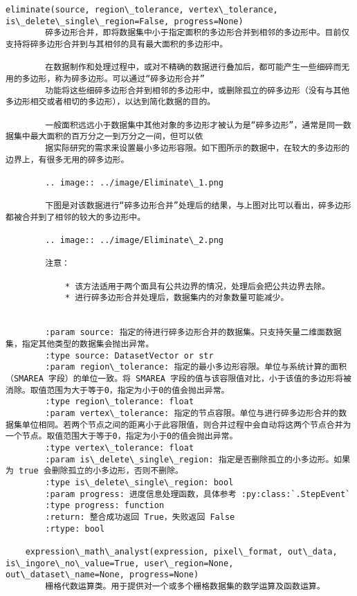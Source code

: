 \documentclass[11pt]{article}
\begin{document}
\begin{Verbatim}[commandchars=\\\{\}]
    eliminate(source, region\_tolerance, vertex\_tolerance, is\_delete\_single\_region=False, progress=None)
        碎多边形合并，即将数据集中小于指定面积的多边形合并到相邻的多边形中。目前仅支持将碎多边形合并到与其相邻的具有最大面积的多边形中。
        
        在数据制作和处理过程中，或对不精确的数据进行叠加后，都可能产生一些细碎而无用的多边形，称为碎多边形。可以通过“碎多边形合并”
        功能将这些细碎多边形合并到相邻的多边形中，或删除孤立的碎多边形（没有与其他多边形相交或者相切的多边形），以达到简化数据的目的。
        
        一般面积远远小于数据集中其他对象的多边形才被认为是“碎多边形”，通常是同一数据集中最大面积的百万分之一到万分之一间，但可以依
        据实际研究的需求来设置最小多边形容限。如下图所示的数据中，在较大的多边形的边界上，有很多无用的碎多边形。
        
        .. image:: ../image/Eliminate\_1.png
        
        下图是对该数据进行“碎多边形合并”处理后的结果，与上图对比可以看出，碎多边形都被合并到了相邻的较大的多边形中。
        
        .. image:: ../image/Eliminate\_2.png
        
        注意：
        
            * 该方法适用于两个面具有公共边界的情况，处理后会把公共边界去除。
            * 进行碎多边形合并处理后，数据集内的对象数量可能减少。
        
        
        :param source: 指定的待进行碎多边形合并的数据集。只支持矢量二维面数据集，指定其他类型的数据集会抛出异常。
        :type source: DatasetVector or str
        :param region\_tolerance: 指定的最小多边形容限。单位与系统计算的面积（SMAREA 字段）的单位一致。将 SMAREA 字段的值与该容限值对比，小于该值的多边形将被消除。取值范围为大于等于0，指定为小于0的值会抛出异常。
        :type region\_tolerance: float
        :param vertex\_tolerance: 指定的节点容限。单位与进行碎多边形合并的数据集单位相同。若两个节点之间的距离小于此容限值，则合并过程中会自动将这两个节点合并为一个节点。取值范围大于等于0，指定为小于0的值会抛出异常。
        :type vertex\_tolerance: float
        :param is\_delete\_single\_region: 指定是否删除孤立的小多边形。如果为 true 会删除孤立的小多边形，否则不删除。
        :type is\_delete\_single\_region: bool
        :param progress: 进度信息处理函数，具体参考 :py:class:`.StepEvent`
        :type progress: function
        :return: 整合成功返回 True，失败返回 False
        :rtype: bool
    
    expression\_math\_analyst(expression, pixel\_format, out\_data, is\_ingore\_no\_value=True, user\_region=None, out\_dataset\_name=None, progress=None)
        栅格代数运算类。用于提供对一个或多个栅格数据集的数学运算及函数运算。
        

\end{Verbatim}
\end{document}
